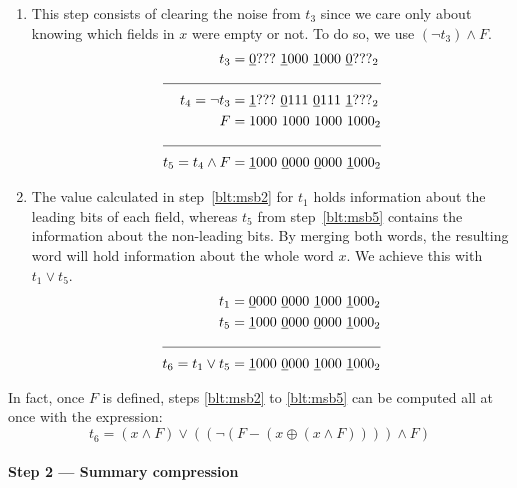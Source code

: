 \begin{enumerate}
    \item \label{blt:msb5}
    This step consists of clearing the noise from $t_3$ since we care only about knowing which fields in $x$ were empty or not. To do so, we use $(\neg t_3) \wedge F$.
    \begin{align*}
                       t_3 &= \underline{0}???\ \underline{1}000\ \underline{1}000\ \underline{0}???_2 \\ \cline{1-2} 
            t_4 = \neg t_3 &= \underline{1}???\ \underline{0}111\ \underline{0}111\ \underline{1}???_2 \\
                         F &= 1000\ 1000\ 1000\ 1000_2 \\ \cline{1-2} 
        t_5 = t_4 \wedge F &= \underline{1}000\ \underline{0}000\ \underline{0}000\ \underline{1}000_2
    \end{align*}
    
    \item \label{blt:msb6}
    The value calculated in step~\ref{blt:msb2} for $t_1$ holds information about the leading bits of each field, whereas $t_5$ from step~\ref{blt:msb5} contains the information about the non-leading bits. By merging both words, the resulting word will hold information about the whole word $x$. We achieve this with $t_1 \vee t_5$.
    \begin{align*}
                       t_1 &= \underline{0}000\ \underline{0}000\ \underline{1}000\ \underline{1}000_2 \\
                       t_5 &= \underline{1}000\ \underline{0}000\ \underline{0}000\ \underline{1}000_2 \\ \cline{1-2} 
        t_6 = t_1 \vee t_5 &= \underline{1}000\ \underline{0}000\ \underline{1}000\ \underline{1}000_2
    \end{align*}
\end{enumerate}

In fact, once $F$ is defined, steps \ref{blt:msb2} to \ref{blt:msb5} can be computed all at once with the expression:
\begin{equation}
    t_6 = (x \wedge F) \vee ((\neg(F - (x \oplus(x \wedge F)))) \wedge F)
\end{equation}

\paragraph{Step 2 --- Summary compression} \label{sec:summaryCompression}

